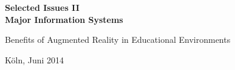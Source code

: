 \vspace*{1mm}

\thispagestyle{empty}


\vspace*{23mm}

% 
\begin{center}
\textbf{
    Selected Issues II\\
    Major Information Systems
}
\end{center}

\vspace*{20mm}

\begin{center}
\LARGE 
Benefits of Augmented Reality in Educational Environments
\end{center}

\vspace*{8mm}

\begin{center}

\end{center}

\vspace*{12mm}

\begin{center}
Köln, Juni 2014
\end{center}